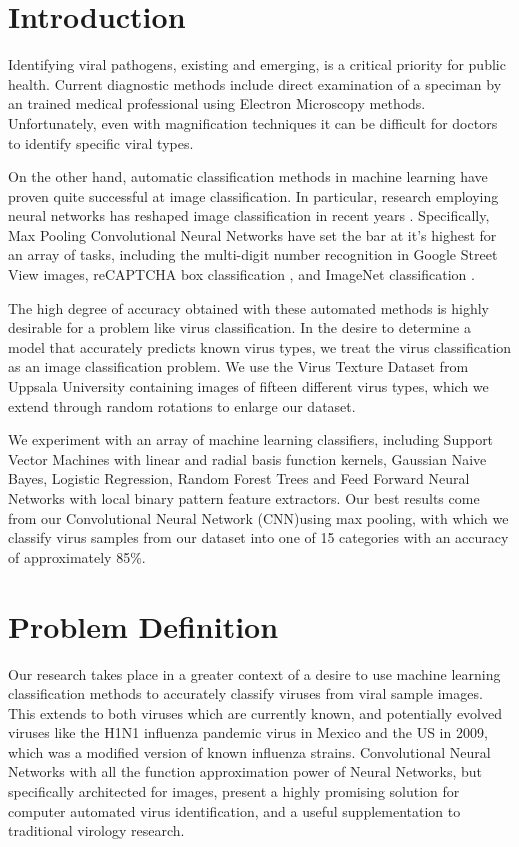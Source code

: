 \begin{multicols}{2}
\section{Introduction}
Identifying viral pathogens, existing and emerging, is a critical priority for public health. Current diagnostic methods include direct examination of a speciman by an trained medical professional using Electron Microscopy methods. Unfortunately, even with magnification techniques it can be difficult for doctors to identify specific viral types. 

On the other hand, automatic classification methods in machine learning have proven quite successful at image classification. In particular, research employing neural networks has reshaped image classification in recent years \citet{Juergen_2015}. Specifically, Max Pooling Convolutional Neural Networks have set the bar at it's highest for an array of tasks, including the multi-digit number recognition in Google Street View images, reCAPTCHA box classification \citet{DBLP:journals/corr/GoodfellowBIAS13}, and ImageNet classification \citet{NIPS2012_4824}. 

The high degree of accuracy obtained with these automated methods is highly desirable for a problem like virus classification. In the desire to determine a model that accurately predicts known virus types, we treat the virus classification as an image classification problem. We use the Virus Texture Dataset from Uppsala University containing images of fifteen different virus types, which we extend through random rotations to enlarge our dataset. 

We experiment with an array of machine learning classifiers, including Support Vector Machines with linear and radial basis function kernels, Gaussian Naive Bayes, Logistic Regression, Random Forest Trees and Feed Forward Neural Networks with local binary pattern feature extractors. Our best results come from our Convolutional Neural Network (CNN)using max pooling, with which we classify virus samples from our dataset into one of 15 categories with an accuracy of approximately 85\%. 


\section{Problem Definition}

Our research takes place in a greater context of a desire to use machine learning classification methods to accurately classify viruses from viral sample images. This extends to both viruses which are currently known, and potentially evolved viruses like the H1N1 influenza pandemic virus in Mexico and the US in 2009, which was a modified version of known influenza strains. Convolutional Neural Networks with all the function approximation power of Neural Networks, but specifically architected for images, present a highly promising solution for computer automated virus identification, and a useful supplementation to traditional virology research. 


\end{multicols}
